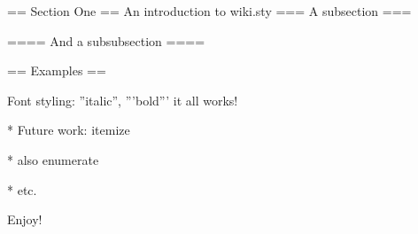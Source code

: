 \usepackage{wiki}

\wikimarkup

== Section One ==
An introduction to wiki.sty
=== A subsection ===

==== And a subsubsection ====

== Examples ==

Font styling: ''italic'', '''bold''' it all works!

* Future work: itemize

* also enumerate

* etc.

Enjoy! %
